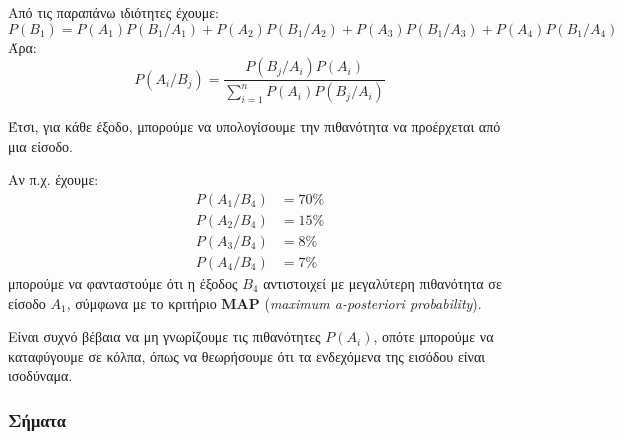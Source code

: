 \documentclass[11pt,a4paper,notitlepage,fleqn,final]{article}
\begin{document}
	Από τις παραπάνω ιδιότητες έχουμε:
	\[
	P(B_1) = P(A_1)P(B_1/A_1)
	+P(A_2)P(B_1/A_2)
	+P(A_3)P(B_1/A_3)
	+P(A_4)P(B_1/A_4)
	\]
	Άρα:
	\[
		P(A_i/B_j) = \frac{P(B_j/A_i)P(A_i)}{
			\sum_{i=1}^n P(A_i)P(B_j/A_i)
			}
	\]

	Έτσι, για κάθε έξοδο, μπορούμε να υπολογίσουμε την πιθανότητα
	να προέρχεται από μια είσοδο.

	Αν π.χ. έχουμε: \begin{align*}
		P(A_1/B_4) &= 70\% \\
		P(A_2/B_4) &= 15\% \\
		P(A_3/B_4) &= 8\% \\
		P(A_4/B_4) &= 7\%
	\end{align*}
	μπορούμε να φανταστούμε ότι η έξοδος \( B_4 \) αντιστοιχεί με
	μεγαλύτερη πιθανότητα σε είσοδο \( A_1 \), σύμφωνα με το κριτήριο
	\textbf{MAP} (\textit{maximum a-posteriori probability}).

	Είναι συχνό βέβαια να μη γνωρίζουμε τις 
	πιθανότητες \( P(A_i) \), οπότε μπορούμε να καταφύγουμε σε κόλπα,
	όπως να θεωρήσουμε ότι τα ενδεχόμενα της εισόδου είναι ισοδύναμα.

	\subsubsection{Σήματα}
	\hspace{0pt}
\end{document}

